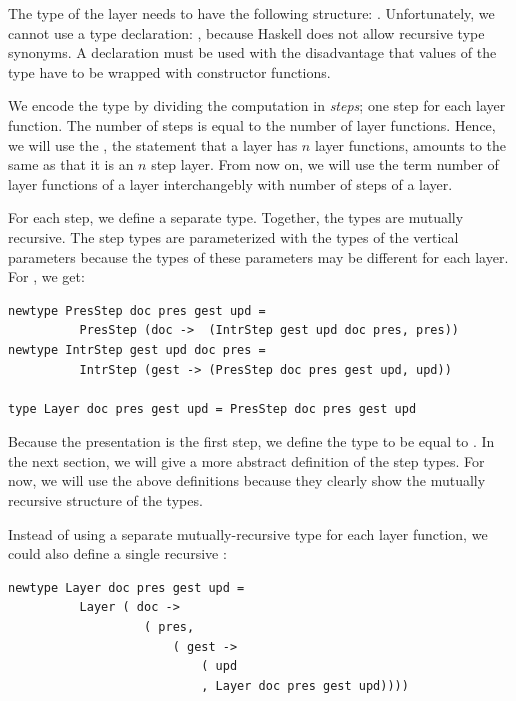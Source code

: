 \documentclass[preprint,natbib]{sigplanconf}
\begin{document}

The type of the layer needs to have the following structure: 
.  Unfortunately, we cannot use a type declaration: , because Haskell does not allow recursive type synonyms. A  declaration must be used with the disadvantage that values of the type have to be wrapped with constructor functions.

\bc
We encode the type by dividing the computation in {\em steps}; one step for each layer function. The number of steps is equal to the number of layer functions. Hence, we will use the , the statement that a layer has $n$ layer functions, amounts to the same as that it is an $n$ step layer. From now on, we will use the term number of layer functions of a layer interchangebly with number of steps of a layer.

For each step, we define a separate type. Together, the types are mutually recursive. The step types are parameterized with the types of the vertical parameters because the types of these parameters may be different for each layer. For , we get:

\begin{small}
\begin{verbatim}
newtype PresStep doc pres gest upd = 
          PresStep (doc ->  (IntrStep gest upd doc pres, pres))
newtype IntrStep gest upd doc pres = 
          IntrStep (gest -> (PresStep doc pres gest upd, upd)) 

type Layer doc pres gest upd = PresStep doc pres gest upd  
\end{verbatim}
\end{small}

Because the presentation is the first step, we define the  type to be equal to . In the next section, we will give a more abstract definition of the step types. For now, we will use the above definitions because they clearly show the mutually recursive structure of the types. %

Instead of using a separate mutually-recursive type for each layer function, we could also define a single recursive :
\ec
\begin{small}
\begin{verbatim}
newtype Layer doc pres gest upd = 
          Layer ( doc -> 
                   ( pres, 
                       ( gest -> 
                           ( upd 
                           , Layer doc pres gest upd))))
\end{verbatim}
\end{small}
\end{document}
